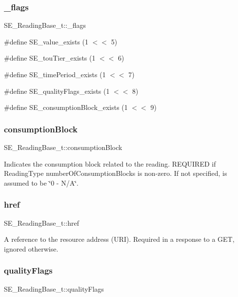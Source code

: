 \subsubsection{\texorpdfstring{\+\_\+flags}{\_flags}}
{\footnotesize\ttfamily S\+E\+\_\+\+Reading\+Base\+\_\+t\+::\+\_\+flags}

\#define S\+E\+\_\+value\+\_\+exists (1 $<$$<$ 5)

\#define S\+E\+\_\+tou\+Tier\+\_\+exists (1 $<$$<$ 6)

\#define S\+E\+\_\+time\+Period\+\_\+exists (1 $<$$<$ 7)

\#define S\+E\+\_\+quality\+Flags\+\_\+exists (1 $<$$<$ 8)

\#define S\+E\+\_\+consumption\+Block\+\_\+exists (1 $<$$<$ 9) \mbox{\label{group__ReadingBase_ga92c363358c08a8377a2bc6fa4c2bbfca}} 
\subsubsection{\texorpdfstring{consumption\+Block}{consumptionBlock}}
{\footnotesize\ttfamily S\+E\+\_\+\+Reading\+Base\+\_\+t\+::consumption\+Block}

Indicates the consumption block related to the reading. R\+E\+Q\+U\+I\+R\+ED if Reading\+Type number\+Of\+Consumption\+Blocks is non-\/zero. If not specified, is assumed to be \char`\"{}0 -\/ N/\+A\char`\"{}. \mbox{\label{group__ReadingBase_ga5750523127b69f62ba464b3a300e2012}} 
\subsubsection{\texorpdfstring{href}{href}}
{\footnotesize\ttfamily S\+E\+\_\+\+Reading\+Base\+\_\+t\+::href}

A reference to the resource address (U\+RI). Required in a response to a G\+ET, ignored otherwise. \mbox{\label{group__ReadingBase_gadb77e76eaaa912c124844cb44f5fa473}} 
\subsubsection{\texorpdfstring{quality\+Flags}{qualityFlags}}
{\footnotesize\ttfamily S\+E\+\_\+\+Reading\+Base\+\_\+t\+::quality\+Flags}

